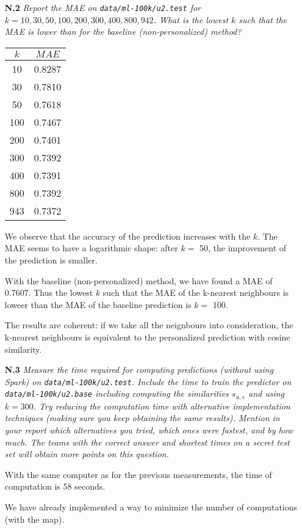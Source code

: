 \documentclass{article}
\begin{document}
\begin{itemize}
    \item [\textbf{N.2}] \textit{Report the MAE on \texttt{data/ml-100k/u2.test} for $k = {10, 30, 50, 100, 200, 300, 400, 800, 942}$. What is the lowest $k$ such that the MAE is lower than for the baseline (non-personalized) method?} 
    \begin{center}
    \begin{tabular}{|c|c|}
  \hline
  $k$ & $MAE$ \\
  \hline
  10 & 0.8287 \\
  \hline
  30 & 0.7810 \\
  \hline
  50 & 0.7618 \\
  \hline
  100 & 0.7467 \\
  \hline
  200 & 0.7401 \\
  \hline
  300 & 0.7392 \\
  \hline
  400 & 0.7391 \\
  \hline
  800 & 0.7392 \\
  \hline
  943 & 0.7372 \\
  \hline
	\end{tabular}
	\end{center}
	
	We observe that the accuracy of the prediction increases with the $k$. The MAE seems to have a logarithmic shape: after $k=$ 50, the improvement of the prediction is smaller.
	
	With the baseline (non-personalized) method, we have found a MAE of 0.7607. Thus the lowest $k$ such that the MAE of the k-nearest neighbours is loweer than the MAE of the baseline prediction is $k=$ 100. 
	
	The results are coherent: if we take all the neignbours into consideration, the k-nearest neighbours is equivalent to the personalized prediction with cosine similarity.
    
     \item [\textbf{N.3}] \label{q-total-time} \textit{Measure the time required for computing predictions (without using Spark) on \texttt{data/ml-100k/u2.test}. Include the time to train the predictor on \newline \texttt{data/ml-100k/u2.base} including computing the similarities $s_{u,v}$ and using $k=300$. Try reducing the computation time with alternative implementation techniques (making sure you keep obtaining the same results). Mention in your report which alternatives you tried,  which ones were fastest, and by how much. The teams with the correct answer and shortest times on a secret test set will obtain more points on this question.}
    
    With the same computer as for the previous measurements, the time of computation is 58 seconds. 
    
    We have already  implemented a way to minimize the number of computations (with the map).     
     
\end{itemize}
\end{document}

